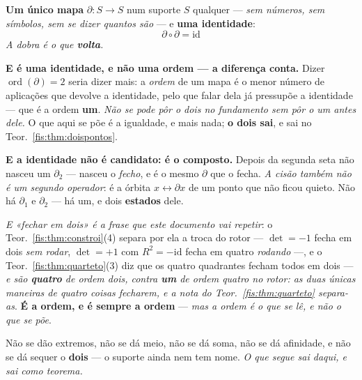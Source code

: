 \documentclass[livro.tex]{subfiles}
\begin{document}
\begin{definicao}[o operador]\label{fis:def:op}
\textbf{Um único mapa} $\partial\colon S\to S$ num suporte $S$ qualquer ---
\emph{sem números, sem símbolos, sem se dizer quantos são} --- e \textbf{uma
identidade}:
\[
\boxed{\;\partial\circ\partial=\mathrm{id}\;}
\]
\emph{A dobra é o que \textbf{volta}.}

\medskip\noindent\textbf{E é uma identidade, e não uma ordem --- a diferença
conta.} Dizer $\operatorname{ord}(\partial)=2$ seria dizer mais: a \emph{ordem}
de um mapa é o menor número de aplicações que devolve a identidade, pelo que
falar dela já pressupõe a identidade --- que é a ordem \textbf{um}. \emph{Não se
pode pôr o dois no fundamento sem pôr o um antes dele.} O que aqui se põe é a
igualdade, e mais nada; \textbf{o dois sai}, e sai no
Teor.~\ref{fis:thm:doispontos}.

\medskip\noindent\textbf{E a identidade não é candidato: é o composto.} Depois da
segunda seta não nasceu um $\partial_2$ --- nasceu o \emph{fecho}, e é o mesmo
$\partial$ que o fecha. \emph{A cisão também não é um segundo operador}: é a
órbita $x\longleftrightarrow\partial x$ de um ponto que não ficou quieto. Não há
$\partial_1$ e $\partial_2$ --- há um, e dois \textbf{estados} dele.

\medskip\noindent\emph{E «fechar em dois» é a frase que este documento vai
repetir}: o Teor.~\ref{fis:thm:constroi}(4) separa por ela a troca do rotor ---
$\det=-1$ fecha em dois \emph{sem rodar}, $\det=+1$ com $R^{2}=-\mathrm{id}$
fecha em quatro \emph{rodando} ---, e o Teor.~\ref{fis:thm:quarteto}(3) diz que
os quatro quadrantes fecham todos em dois --- \emph{e são \textbf{quatro} de
ordem dois, contra \textbf{um} de ordem quatro no rotor: as duas únicas maneiras
de quatro coisas fecharem, e a nota do Teor.~\ref{fis:thm:quarteto} separa-as}.
\textbf{É a ordem, e é sempre a ordem} --- \emph{mas a ordem é o que se lê, e não
o que se põe}.

\medskip\noindent Não se dão extremos, não se dá meio, não se dá soma, não se dá
afinidade, e não se dá sequer o \textbf{dois} --- o suporte ainda nem tem nome.
\emph{O que segue sai daqui, e sai como teorema.}
\end{definicao}
\end{document}
